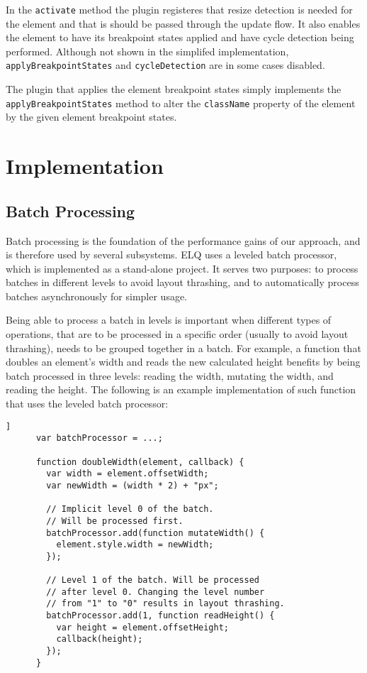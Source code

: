 \documentclass{acm_proc_article-sp}
\newcommand{\code}[1]{\texttt{#1}}
\newcommand{\elq}{ELQ}
\begin{document}
    In the \code{activate} method the plugin registeres that resize detection is needed for the element and that is should be passed through the update flow.
    It also enables the element to have its breakpoint states applied and have cycle detection being performed.
    Although not shown in the simplifed implementation, \code{applyBreakpointStates} and \code{cycleDetection} are in some cases disabled.

    The plugin that applies the element breakpoint states simply implements the \code{applyBreakpointStates} method to alter the \code{className} property of the element by the given element breakpoint states.

\section{Implementation}\label{sec:imp}
  \subsection{Batch Processing}\label{sec:imp_batch_processor}
    Batch processing is the foundation of the performance gains of our approach, and is therefore used by several subsystems.
    \elq{} uses a leveled batch processor, which is implemented as a stand-alone project.
    It serves two purposes: to process batches in different levels to avoid layout thrashing, and to automatically process batches asynchronously for simpler usage.

    Being able to process a batch in levels is important when different types of operations, that are to be processed in a specific order (usually to avoid layout thrashing), needs to be grouped together in a batch.
    For example, a function that doubles an element's width and reads the new calculated height benefits by being batch processed in three levels: reading the width, mutating the width, and reading the height.
    The following is an example implementation of such function that uses the leveled batch processor:

    \begin{lstlisting}[gobble=6,label={},caption={},captionpos=b]]
      var batchProcessor = ...;

      function doubleWidth(element, callback) {
        var width = element.offsetWidth;
        var newWidth = (width * 2) + "px";

        // Implicit level 0 of the batch. 
        // Will be processed first.
        batchProcessor.add(function mutateWidth() {
          element.style.width = newWidth;
        });

        // Level 1 of the batch. Will be processed 
        // after level 0. Changing the level number 
        // from "1" to "0" results in layout thrashing.
        batchProcessor.add(1, function readHeight() {
          var height = element.offsetHeight;
          callback(height);
        });
      }
    \end{lstlisting}
\end{document}
